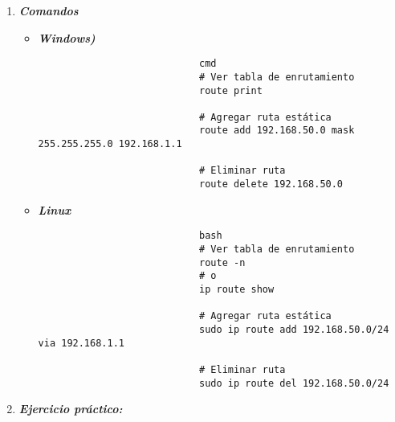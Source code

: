 \documentclass[12pt]{amsart}
\begin{document}
\begin{enumerate}
\begin{enumerate}
						\bigskip\bigskip

			\end{enumerate}
		
		\bigskip\bigskip

		\item \textbf{\textit{Comandos}}
		
		\medskip
			\begin{itemize}
						\bigskip\bigskip

						\item \textbf{\textit{Windows)}}
						
						\medskip
						\noindent \begin{verbatim}
							cmd
							# Ver tabla de enrutamiento
							route print
							
							# Agregar ruta estática
							route add 192.168.50.0 mask 255.255.255.0 192.168.1.1
							
							# Eliminar ruta
							route delete 192.168.50.0		
						\end{verbatim}
						\bigskip\bigskip

						\item \textbf{\textit{Linux}}
						
						\medskip
						\noindent \begin{verbatim}
							bash
							# Ver tabla de enrutamiento
							route -n
							# o
							ip route show
							
							# Agregar ruta estática
							sudo ip route add 192.168.50.0/24 via 192.168.1.1
							
							# Eliminar ruta
							sudo ip route del 192.168.50.0/24
						\end{verbatim}

						\bigskip\bigskip

			\end{itemize}
		
		\bigskip\bigskip

		\item \textbf{\textit{Ejercicio práctico:}}
		

\end{enumerate}
\end{document}
